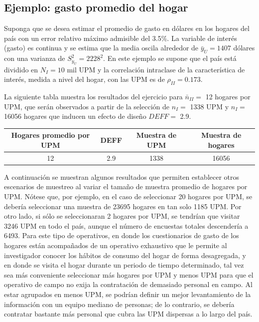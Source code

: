 \documentclass[
  12pt,
  spanish,
]{book}
\begin{document}
\hypertarget{ejemplo-gasto-promedio-del-hogar}{%
\subsection{Ejemplo: gasto promedio del hogar}\label{ejemplo-gasto-promedio-del-hogar}}

Suponga que se desea estimar el promedio de gasto en dólares en los hogares del país con un error relativo máximo admisible del 3.5\%. La variable de interés (gasto) es continua y se estima que la media oscila alrededor de \(\bar{y}_U=1407\) dólares con una varianza de \(S^2_{y_U}=2228^2\). En este ejemplo se supone que el país está dividido en \(N_I = 10\) mil UPM y la correlación intraclase de la característica de interés, medida a nivel del hogar, con las UPM es de \(\rho_{II} = 0.173\).

La siguiente tabla muestra los resultados del ejercicio para \(\bar{n}_{II} =\) 12 hogares por UPM, que serán observados a partir de la selección de \(n_{I} =\) 1338 UPM y \(n_{I} =\) 16056 hogares que inducen un efecto de diseño \(DEFF =\) 2.9.

\begin{longtable}[]{@{}cccc@{}}
\toprule
Hogares promedio por UPM & DEFF & Muestra de UPM & Muestra de hogares \\
\midrule
\endhead
12 & 2.9 & 1338 & 16056 \\
\bottomrule
\end{longtable}

A continuación se muestran algunos resultados que permiten establecer otros escenarios de muestreo al variar el tamaño de muestra promedio de hogares por UPM. Nótese que, por ejemplo, en el caso de seleccionar 20 hogares por UPM, se debería seleccionar una muestra de 23695 hogares en tan solo 1185 UPM. Por otro lado, si sólo se seleccionaran 2 hogares por UPM, se tendrían que visitar 3246 UPM en todo el país, aunque el número de encuestas totales descendería a 6493. Para este tipo de operativos, en donde los cuestionarios de gasto de los hogares están acompañados de un operativo exhaustivo que le permite al investigador conocer los hábitos de consumo del hogar de forma desagregada, y en donde se visita el hogar durante un periodo de tiempo determinado, tal vez sea más conveniente seleccionar más hogares por UPM y menos UPM para que el operativo de campo no exija la contratación de demasiado personal en campo. Al estar agrupados en menos UPM, se podrían definir un mejor levantamiento de la información con un equipo mediano de personas; de lo contrario, se debería contratar bastante más personal que cubra las UPM dispersas a lo largo del país.
\end{document}
